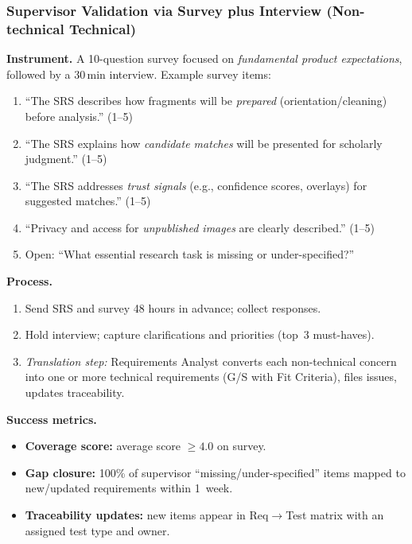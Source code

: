 \documentclass[12pt, titlepage]{article}
\begin{document}
\subsubsection*{Supervisor Validation via Survey plus Interview (Non-technical \textrightarrow{} Technical)}
\textbf{Instrument.} A 10-question survey focused on \emph{fundamental product expectations}, followed by a 30\,min interview. Example survey items:
\begin{enumerate}
  \item ``The SRS describes how fragments will be \emph{prepared} (orientation/cleaning) before analysis.'' (1--5)
  \item ``The SRS explains how \emph{candidate matches} will be presented for scholarly judgment.'' (1--5)
  \item ``The SRS addresses \emph{trust signals} (e.g., confidence scores, overlays) for suggested matches.'' (1--5)
  \item ``Privacy and access for \emph{unpublished images} are clearly described.'' (1--5)
  \item Open: ``What essential research task is missing or under-specified?''
\end{enumerate}
\textbf{Process.}
\begin{enumerate}
  \item Send SRS and survey 48 hours in advance; collect responses.
  \item Hold interview; capture clarifications and priorities (top~3 must-haves).
  \item \emph{Translation step:} Requirements Analyst converts each non-technical concern into one or more technical requirements (G/S with Fit Criteria), files issues, updates traceability.
\end{enumerate}
\textbf{Success metrics.}
\begin{itemize}
  \item \textbf{Coverage score:} average score $\geq 4.0$ on survey.
  \item \textbf{Gap closure:} 100\% of supervisor ``missing/under-specified'' items mapped to new/updated requirements within 1~week.
  \item \textbf{Traceability updates:} new items appear in Req$\rightarrow$Test matrix with an assigned test type and owner.
\end{itemize}
\end{document}
